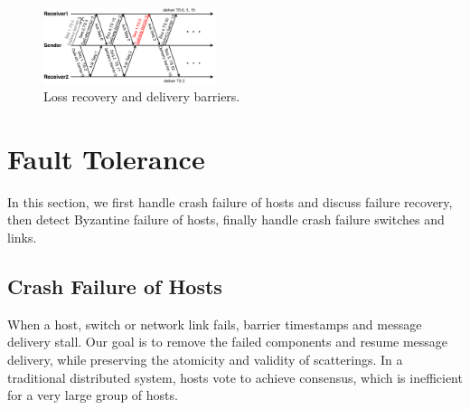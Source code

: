 {\begin{figure}[t]
\centering
\includegraphics[width=0.45\textwidth]{images/loss_detection.pdf}
\caption{Loss recovery and delivery barriers.}
\label{fig:ack-barrier}
\vspace{-0.4em}
\end{figure}




\section{Fault Tolerance}
\label{sec:failure}

In this section, we first handle crash failure of hosts and discuss failure recovery, then detect Byzantine failure of hosts, finally handle crash failure  switches and links.


\subsection{Crash Failure of Hosts}
\label{sec:host-failure}

When a host, switch or network link fails, barrier timestamps and message delivery stall.
Our goal is to remove the failed components and resume message delivery, while preserving the atomicity and validity of scatterings.
In a traditional distributed system, hosts vote to achieve consensus, which is inefficient for a very large group of hosts.

}

